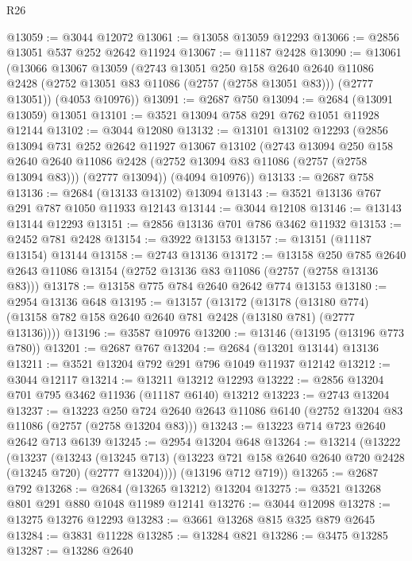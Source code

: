 \begin{lexlean}{R26}
\begin{coremodule}
@13059 := @3044 @12072
@13061 := @13058 @13059 @12293
@13066 := @2856 @13051 @537 @252 @2642 @11924
@13067 := @11187 @2428
@13090 := @13061
    (@13066
      @13067
      @13059
      (@2743
        @13051
        @250
        @158
        @2640
        @2640
        @11086
        @2428
        (@2752 @13051 @83 @11086 (@2757 (@2758 @13051 @83)))
        (@2777 @13051))
      (@4053 @10976))
@13091 := @2687 @750
@13094 := @2684 (@13091 @13059) @13051
@13101 := @3521 @13094 @758 @291 @762 @1051 @11928 @12144
@13102 := @3044 @12080
@13132 := @13101
    @13102
    @12293
    (@2856
      @13094
      @731
      @252
      @2642
      @11927
      @13067
      @13102
      (@2743
        @13094
        @250
        @158
        @2640
        @2640
        @11086
        @2428
        (@2752 @13094 @83 @11086 (@2757 (@2758 @13094 @83)))
        (@2777 @13094))
      (@4094 @10976))
@13133 := @2687 @758
@13136 := @2684 (@13133 @13102) @13094
@13143 := @3521 @13136 @767 @291 @787 @1050 @11933 @12143
@13144 := @3044 @12108
@13146 := @13143 @13144 @12293
@13151 := @2856 @13136 @701 @786 @3462 @11932
@13153 := @2452 @781 @2428
@13154 := @3922 @13153
@13157 := @13151 (@11187 @13154) @13144
@13158 := @2743 @13136
@13172 := @13158
    @250
    @785
    @2640
    @2643
    @11086
    @13154
    (@2752 @13136 @83 @11086 (@2757 (@2758 @13136 @83)))
@13178 := @13158 @775 @784 @2640 @2642 @774 @13153
@13180 := @2954 @13136 @648
@13195 := @13157
    (@13172
      (@13178 (@13180 @774) (@13158 @782 @158 @2640 @2640 @781 @2428 (@13180 @781) (@2777 @13136))))
@13196 := @3587 @10976
@13200 := @13146 (@13195 (@13196 @773 @780))
@13201 := @2687 @767
@13204 := @2684 (@13201 @13144) @13136
@13211 := @3521 @13204 @792 @291 @796 @1049 @11937 @12142
@13212 := @3044 @12117
@13214 := @13211 @13212 @12293
@13222 := @2856 @13204 @701 @795 @3462 @11936 (@11187 @6140) @13212
@13223 := @2743 @13204
@13237 := @13223
    @250
    @724
    @2640
    @2643
    @11086
    @6140
    (@2752 @13204 @83 @11086 (@2757 (@2758 @13204 @83)))
@13243 := @13223 @714 @723 @2640 @2642 @713 @6139
@13245 := @2954 @13204 @648
@13264 := @13214
    (@13222
      (@13237
        (@13243
          (@13245 @713)
          (@13223 @721 @158 @2640 @2640 @720 @2428 (@13245 @720) (@2777 @13204))))
      (@13196 @712 @719))
@13265 := @2687 @792
@13268 := @2684 (@13265 @13212) @13204
@13275 := @3521 @13268 @801 @291 @880 @1048 @11989 @12141
@13276 := @3044 @12098
@13278 := @13275 @13276 @12293
@13283 := @3661 @13268 @815 @325 @879 @2645
@13284 := @3831 @11228
@13285 := @13284 @821
@13286 := @3475 @13285
@13287 := @13286 @2640

\end{coremodule}
\end{lexlean}
